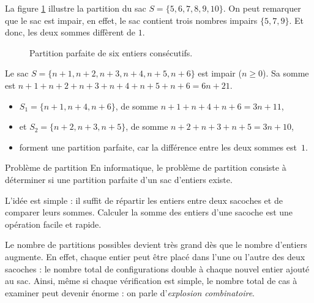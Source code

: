 \documentclass[a4paper,twoside]{article}
\begin{document}
  La figure \ref{fig:six} illustre la partition du sac $S = \{5, 6, 7, 8, 9, 10\}$.
  On peut remarquer que le sac est impair, en effet, le sac contient trois nombres impairs $\{5, 7, 9\}$.
  Et donc, les deux sommes diffèrent de $1$.

  \begin{figure}[htbp]
    \centering
    \caption{Partition parfaite de six entiers consécutifs.}
    \label{fig:six}
  \end{figure}


  \begin{solution}
    Le sac $S = \{ n + 1, n + 2, n + 3, n + 4, n + 5, n + 6\}$ est impair ($n \geq 0$).
    Sa somme est $n + 1 +n + 2 + n + 3 + n + 4 + n + 5 + n + 6 = 6n + 21$.
    \begin{itemize}
    \item $S_1 = \{ n + 1, n + 4, n + 6\}$, de somme $n + 1 + n + 4 + n + 6 = 3n + 11$,
    \item et $S_2 = \{n + 2, n + 3, n + 5\}$, de somme $n + 2 + n + 3 + n + 5 = 3n + 10$,
    \item forment une partition parfaite, car la différence entre les deux sommes est~$1$.
    \end{itemize}
  \end{solution}


  \begin{definition}{Problème de partition}
    En informatique, le problème de partition consiste à déterminer si une partition parfaite d'un sac d'entiers existe.

    L'idée est simple : il suffit de répartir les entiers entre deux sacoches et de comparer leurs sommes.
    Calculer la somme des entiers d'une sacoche est une opération facile et rapide.
  \end{definition}

  Le nombre de partitions possibles devient très grand dès que le nombre d'entiers augmente.
  En effet, chaque entier peut être placé dans l'une ou l'autre des deux sacoches :
  le nombre total de configurations double à chaque nouvel entier ajouté au sac.
  Ainsi, même si chaque vérification est simple, le nombre total de cas à examiner peut devenir énorme : on parle d'\emph{explosion combinatoire}.
\end{document}
